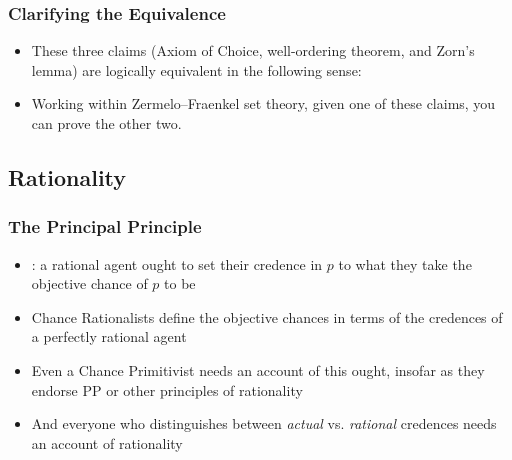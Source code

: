 \begin{frame}
\frametitle{Clarifying the Equivalence}

\begin{itemize}[<+->]

\item These three claims (Axiom of Choice, well-ordering theorem, and Zorn's lemma) are logically equivalent in the following sense:

\item Working within Zermelo--Fraenkel set theory, given one of these claims, you can prove the other two.

\end{itemize}
\end{frame}





\subsection{Rationality}

\begin{frame}
\frametitle{The Principal Principle}

\begin{itemize}[<+->]

\item {}: a rational agent \textcolor{OGlyallpink}{ought} to set their credence in $p$ to what they take the objective chance of $p$ to be

\item Chance Rationalists define the objective chances in terms of the credences of a \textcolor{OGlyallpink}{perfectly rational agent}

\item Even a Chance Primitivist needs an account of this \textcolor{OGlyallpink}{ought}, insofar as they endorse PP or other principles of rationality

\item And everyone who distinguishes between \textit{actual} vs. \textit{rational} credences needs an account of rationality


\end{itemize}
\end{frame}

